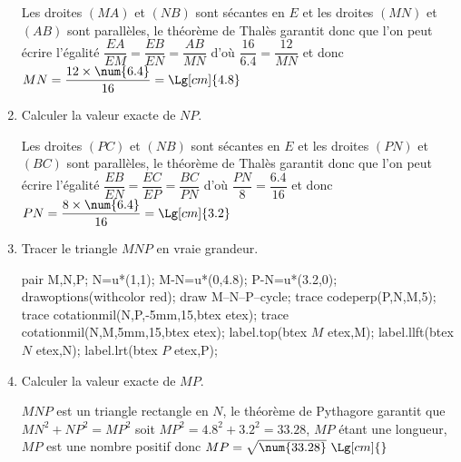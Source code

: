 \begin{corrige}
\begin{enumerate}
        {\color{red} Les droites $(MA)$ et $(NB)$ sont sécantes en $E$ et les droites $(MN)$ et $(AB)$ sont parallèles, le théorème de Thalès garantit donc que l'on peut écrire
        l'égalité $\dfrac{EA}{EM}=\dfrac{EB}{EN}=\dfrac{AB}{MN}$ d'où $\dfrac{16}{\num{6.4}}=\dfrac{12}{MN}$ et donc $MN=\dfrac{12\times\num{6.4}}{16}=\Lg[cm]{4.8}$}
        \item Calculer la valeur exacte de $NP$.
        
        {\color{red} Les droites $(PC)$ et $(NB)$ sont sécantes en $E$ et les droites $(PN)$ et $(BC)$ sont parallèles, le théorème de Thalès garantit donc que l'on peut écrire
        l'égalité $\dfrac{EB}{EN}=\dfrac{EC}{EP}=\dfrac{BC}{PN}$ d'où $\dfrac{PN}{8}=\dfrac{\num{6.4}}{16}$ et donc $PN=\dfrac{8\times\num{6.4}}{16}=\Lg[cm]{3.2}$}
        \item Tracer le triangle $MNP$ en vraie grandeur.
        
        \begin{Geometrie}
            pair M,N,P;
            N=u*(1,1);
            M-N=u*(0,4.8);
            P-N=u*(3.2,0);
            drawoptions(withcolor red);
            draw M--N--P--cycle;
            trace codeperp(P,N,M,5);
            trace cotationmil(N,P,-5mm,15,btex  etex);
            trace cotationmil(N,M,5mm,15,btex  etex);
            label.top(btex $M$ etex,M);
            label.llft(btex $N$ etex,N);
            label.lrt(btex $P$ etex,P);
        \end{Geometrie}
        \item Calculer la valeur exacte de $MP$.
        
        {\color{red} $MNP$ est un triangle rectangle en $N$, le théorème de Pythagore garantit que $MN^2+NP^2=MP^2$ soit $MP^2=\num{4.8}^2+\num{3.2}^2=\num{33.28}$, $MP$ étant une longueur, $MP$ est une nombre positif
        donc $MP=\sqrt{\num{33.28}}~\Lg[cm]{}$}
    \end{enumerate}
\end{corrige}

